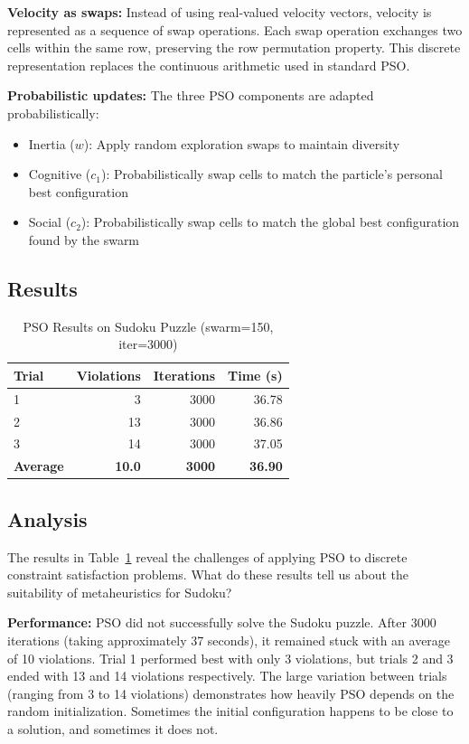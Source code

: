 \documentclass[letterpaper]{article}
\begin{document}
\textbf{Velocity as swaps:} Instead of using real-valued velocity vectors, velocity is represented as a sequence of swap operations. Each swap operation exchanges two cells within the same row, preserving the row permutation property. This discrete representation replaces the continuous arithmetic used in standard PSO.

\textbf{Probabilistic updates:} The three PSO components are adapted probabilistically:
\begin{itemize}
\item Inertia ($w$): Apply random exploration swaps to maintain diversity
\item Cognitive ($c_1$): Probabilistically swap cells to match the particle's personal best configuration
\item Social ($c_2$): Probabilistically swap cells to match the global best configuration found by the swarm
\end{itemize}

\subsection{Results}

\begin{table}[h]
\centering
\caption{PSO Results on Sudoku Puzzle (swarm=150, iter=3000)}
\label{tab:pso-sudoku}
\begin{tabular}{@{}lrrr@{}}
\toprule
\textbf{Trial} & \textbf{Violations} & \textbf{Iterations} & \textbf{Time (s)} \\
\midrule
1 & 3 & 3000 & 36.78 \\
2 & 13 & 3000 & 36.86 \\
3 & 14 & 3000 & 37.05 \\
\midrule
\textbf{Average} & \textbf{10.0} & \textbf{3000} & \textbf{36.90} \\
\bottomrule
\end{tabular}
\end{table}

\subsection{Analysis}

The results in Table~\ref{tab:pso-sudoku} reveal the challenges of applying PSO to discrete constraint satisfaction problems. What do these results tell us about the suitability of metaheuristics for Sudoku?

\textbf{Performance:} PSO did not successfully solve the Sudoku puzzle. After 3000 iterations (taking approximately 37 seconds), it remained stuck with an average of 10 violations. Trial 1 performed best with only 3 violations, but trials 2 and 3 ended with 13 and 14 violations respectively. The large variation between trials (ranging from 3 to 14 violations) demonstrates how heavily PSO depends on the random initialization. Sometimes the initial configuration happens to be close to a solution, and sometimes it does not.
\end{document}
